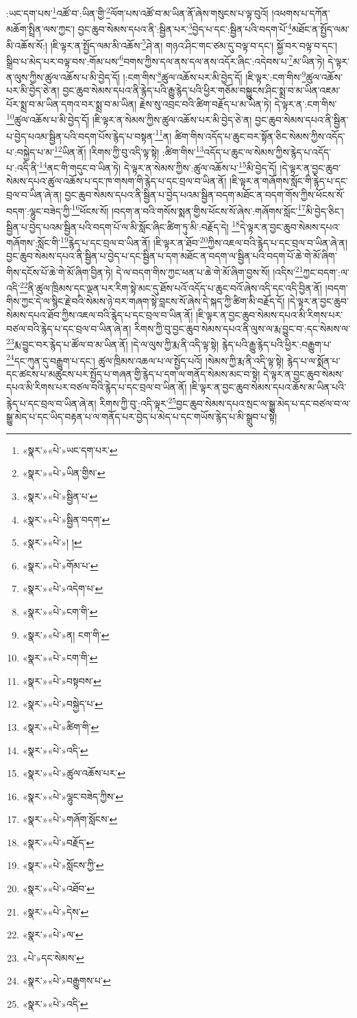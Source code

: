 :ཡང་དག་པས་\footnote{«སྣར་»«པེ་»ཡང་དག་པར་}འཚོ་བ་:ཡིན་གྱི་\footnote{«སྣར་»«པེ་»ཡིན་གྱིས་}ལོག་པས་འཚོ་བ་མ་ཡིན་ནོ་ཞེས་གསུངས་པ་ལྟ་བུའོ། །འཕགས་པ་དཀོན་མཆོག་སྤྲིན་ལས་ཀྱང་། བྱང་ཆུབ་སེམས་དཔའ་ནི་:སྦྱིན་པར་\footnote{«སྣར་»«པེ་»སྦྱིན་པ་}བྱེད་པ་དང་:སྦྱིན་པའི་བདག་པོ་\footnote{«སྣར་»«པེ་»སྦྱིན་བདག་}མཐོང་ན་སྤྱོད་ལམ་མི་འཆོས་སོ:། །ཇི་ལྟར་ན་སྤྱོད་ལམ་མི་འཆོས་\footnote{«སྣར་»«པེ་»། །}ཤེ་ན། གཉའ་ཤིང་གང་ཙམ་དུ་བལྟ་བ་དང་། སྐྱོ་བར་བལྟ་བ་དང་། སྒྲིབ་པ་མེད་པར་བལྟ་བས་:གོམ་པས་\footnote{«སྣར་»«པེ་»གོམ་པ་}བགས་ཀྱིས་དལ་ནས་དལ་ནས་འདོར་ཞིང་:འདེབས་པ་\footnote{«སྣར་»«པེ་»འདེག་པ་}མ་ཡིན་ཏེ། དེ་ལྟར་ན་ལུས་ཀྱིས་ཚུལ་འཆོས་པ་མི་བྱེད་དོ། །:ངག་གིས་\footnote{«སྣར་»«པེ་»ངག་གི་}ཚུལ་འཆོས་པར་མི་བྱེད་དོ། །ཇི་ལྟར་:ངག་གིས་\footnote{«སྣར་»«པེ་»ན། ངག་གི་}ཚུལ་འཆོས་པར་མི་བྱེད་ཅེ་ན། བྱང་ཆུབ་སེམས་དཔའ་ནི་རྙེད་པའི་རྒྱུ་རྙེད་པའི་ཕྱིར་གཅོམ་བསྐྱུངས་ཤིང་སྨྲ་བ་མ་ཡིན་འཇམ་པོར་སྨྲ་བ་མ་ཡིན་དགའ་བར་སྨྲ་བ་མ་ཡིན། རྗེས་སུ་འབྲང་བའི་ཚིག་བརྗོད་པ་མ་ཡིན་ཏེ། དེ་ལྟར་ན་:ངག་གིས་\footnote{«སྣར་»«པེ་»ངག་གི་}ཚུལ་འཆོས་པ་མི་བྱེད་དོ། །ཇི་ལྟར་ན་སེམས་ཀྱིས་ཚུལ་འཆོས་པར་མི་བྱེད་ཅེ་ན། བྱང་ཆུབ་སེམས་དཔའ་ནི་སྦྱིན་པ་བྱེད་པའམ་སྦྱིན་པའི་བདག་པོས་རྙེད་པ་བསྟན་\footnote{«སྣར་»«པེ་»བསྟབས་}ན། ཚིག་གིས་འདོད་པ་ཆུང་བར་སྟོན་ཅིང་སེམས་ཀྱིས་འདོད་པ་:བསྐྱེད་པ་མ་\footnote{«སྣར་»«པེ་»བསྐྱེད་པ་}ཡིན་ནོ། །རིགས་ཀྱི་བུ་འདི་ལྟ་སྟེ། :ཚིག་གིས་\footnote{«སྣར་»«པེ་»ཚིག་གི་}འདོད་པ་ཆུང་ལ་སེམས་ཀྱིས་རྙེད་པ་འདོད་པ་:འདི་ནི་\footnote{«སྣར་»«པེ་»འདི་}ནང་གི་གདུང་བ་ཡིན་ཏེ། དེ་ལྟར་ན་སེམས་ཀྱིས་:ཚུལ་འཆོས་པ་\footnote{«སྣར་»«པེ་»ཚུལ་འཆོས་པར་}མི་བྱེད་དོ། །དེ་ལྟར་ན་བྱང་ཆུབ་སེམས་དཔའ་ཚུལ་འཆོས་པ་དང་ཁ་གསག་གི་རྙེད་པ་དང་བྲལ་བ་ཡིན་ནོ། །ཇི་ལྟར་ན་གཞོགས་སློང་གི་རྙེད་པ་དང་བྲལ་བ་ཡིན་ཞེ་ན། བྱང་ཆུབ་སེམས་དཔའ་ནི་སྦྱིན་པ་བྱེད་པའམ་སྦྱིན་བདག་མཐོང་ན་བདག་གོས་ཀྱིས་ཕོངས་སོ་བདག་:ལྷུང་བཟེད་ཀྱི་\footnote{«སྣར་»«པེ་»ལྷུང་བཟེད་ཀྱིས་}ཕོངས་སོ། །བདག་ན་བའི་གསོས་སྨན་གྱིས་ཕོངས་སོ་ཞེས་:གཞོགས་སློང་\footnote{«སྣར་»«པེ་»གཞོག་སློངས་}མི་བྱེད་ཅིང་། སྦྱིན་པ་བྱེད་པའམ་སྦྱིན་པའི་བདག་པོ་ལ་མི་སློང་ཞིང་ཚིག་ཏུ་མི་:བརྗོད་དེ། \footnote{«སྣར་»«པེ་»བརྗོད་}དེ་ལྟར་ན་བྱང་ཆུབ་སེམས་དཔའ་གཞོགས་:སློང་གི་\footnote{«སྣར་»«པེ་»སློངས་ཀྱི་}རྙེད་པ་དང་བྲལ་བ་ཡིན་ནོ། །ཇི་ལྟར་ན་ཐོབ་\footnote{«སྣར་»«པེ་»འཐོབ་}ཀྱིས་འཇལ་བའི་རྙེད་པ་དང་བྲལ་བ་ཡིན་ཞེ་ན། བྱང་ཆུབ་སེམས་དཔའ་ནི་སྦྱིན་པ་བྱེད་པ་དང་སྦྱིན་པ་དག་མཐོང་ན་བདག་ལ་སྦྱིན་པའི་བདག་པོ་ཆེ་གེ་མོ་ཞིག་གིས་དངོས་པོ་ཆེ་གེ་མོ་ཞིག་བྱིན་ཏེ། དེ་ལ་བདག་གིས་ཀྱང་ཕན་པ་ཆེ་གེ་མོ་ཞིག་བྱས་སོ། །འདིས་\footnote{«སྣར་»«པེ་»དེས་}ཀྱང་བདག་:ལ་འདི་\footnote{«སྣར་»«པེ་»ལ་}ནི་ཚུལ་ཁྲིམས་དང་ལྡན་པར་རིག་སྟེ་མང་དུ་ཐོས་པའོ་འདོད་པ་ཆུང་བའོ་ཞེས་འདི་དང་འདི་བྱིན་ནོ། །བདག་གིས་ཀྱང་དེ་ལ་སྙིང་རྗེ་བའི་སེམས་ཉེ་བར་གཞག་སྟེ་བླངས་སོ་ཞེས་དེ་སྐད་ཀྱི་ཚིག་མི་བརྗོད་དོ། །དེ་ལྟར་ན་བྱང་ཆུབ་སེམས་དཔའ་ཐོབ་ཀྱིས་འཇལ་བའི་རྙེད་པ་དང་བྲལ་བ་ཡིན་ནོ། །ཇི་ལྟར་ན་བྱང་ཆུབ་སེམས་དཔའ་མི་རིགས་པར་བཙལ་བའི་རྙེད་པ་དང་བྲལ་བ་ཡིན་ཞེ་ན། རིགས་ཀྱི་བུ་བྱང་ཆུབ་སེམས་དཔའ་ནི་ལུས་ལ་རྨ་བྱུང་བ་:དང་སེམས་ལ་\footnote{«པེ་»དང་སེམས་}རྨ་བྱུང་བར་རྙེད་པ་ཚོལ་བ་མ་ཡིན་ནོ། །དེ་ལ་ལུས་ཀྱི་རྨ་ནི་འདི་ལྟ་སྟེ། རྙེད་པའི་རྒྱུ་རྙེད་པའི་ཕྱིར་:བརྒྱུག་པ་\footnote{«སྣར་»«པེ་»བརྒྱུགས་པ་}དང་ཀུན་དུ་བརྒྱུག་པ་དང་། ཚུལ་ཁྲིམས་འཆལ་པ་ལ་སྤྱོད་པའོ། །སེམས་ཀྱི་རྨ་ནི་འདི་ལྟ་སྟེ། རྙེད་པ་ལ་སྨོན་པ་དང་ཚངས་པ་མཚུངས་པར་སྤྱོད་པ་གཞན་གྱི་རྙེད་པ་དག་ལ་གནོད་སེམས་མང་བ་སྟེ། དེ་ལྟར་ན་བྱང་ཆུབ་སེམས་དཔའ་མི་རིགས་པར་བཙལ་བའི་རྙེད་པ་དང་བྲལ་བ་ཡིན་ནོ། །ཇི་ལྟར་ན་བྱང་ཆུབ་སེམས་དཔའ་ཆོས་མ་ཡིན་པའི་རྙེད་པ་དང་བྲལ་བ་ཡིན་ཞེ་ན། རིགས་ཀྱི་བུ་:འདི་ལྟར་\footnote{«སྣར་»«པེ་»འདི་}བྱང་ཆུབ་སེམས་དཔའ་སྲང་ལ་སྒྱུ་མེད་པ་དང་བཙལ་བ་ལ་སྒྱུ་མེད་པ་དང་ཡིད་བརྟན་པ་ལ་གནོད་པར་བྱེད་པ་མེད་པ་དང་གཡོས་རྙེད་པ་མི་སྒྲུབ་པ་སྟེ། 